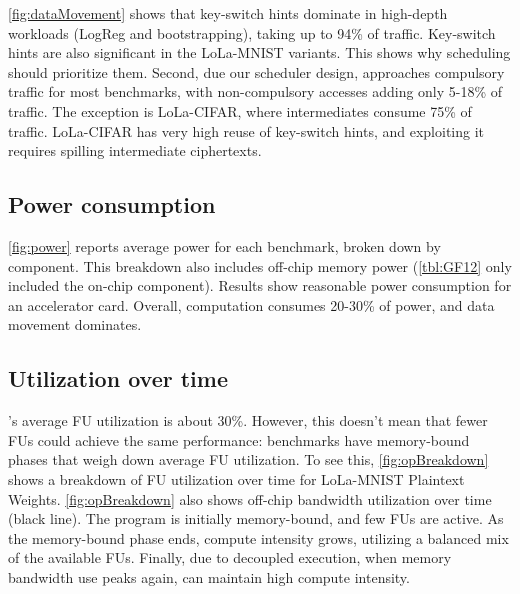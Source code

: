 \autoref{fig:dataMovement} shows that key-switch hints dominate in high-depth workloads
(LogReg and bootstrapping), taking up to 94\% of traffic.
Key-switch hints are also significant in the LoLa-MNIST variants.
This shows why scheduling should prioritize them.
Second, due our scheduler design, \name approaches compulsory
traffic for most benchmarks, with non\hyp{}compulsory accesses
adding only 5-18\% of traffic.
The exception is LoLa-CIFAR, where intermediates consume 75\% of traffic.
LoLa-CIFAR has very high reuse of key-switch hints,
and exploiting it requires spilling intermediate ciphertexts.

\figDataMovement

\subsection{Power consumption}
\autoref{fig:power} reports average power for each benchmark, broken down by component.
This breakdown also includes off-chip memory power (\autoref{tbl:GF12} only included the on-chip component).
Results show reasonable power consumption for an accelerator card.
Overall, computation consumes 20-30\% of power, and data movement dominates.

\subsection{Utilization over time}
\name's average FU utilization is about 30\%.
However, this doesn't mean that fewer FUs could achieve the same performance:
benchmarks have memory\hyp{}bound phases 
that weigh down average FU utilization.
To see this, \autoref{fig:opBreakdown} shows a breakdown of FU utilization over 
time for LoLa-MNIST Plaintext Weights.
\autoref{fig:opBreakdown} also shows off-chip bandwidth utilization over time (black line).
The program is initially memory-bound, and few FUs are active.
As the memory-bound phase ends, compute intensity grows, 
utilizing a balanced mix of the available FUs.
Finally, due to decoupled execution,
when memory bandwidth use peaks again,
\name can maintain high compute intensity.



